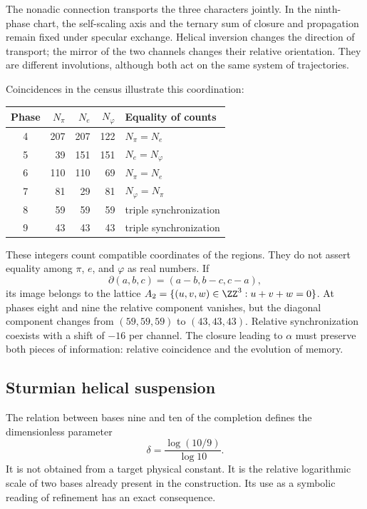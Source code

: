The nonadic connection transports the three characters jointly. In the ninth-phase chart, the self-scaling axis and the ternary sum of closure and propagation remain fixed under specular exchange. Helical inversion changes the direction of transport; the mirror of the two channels changes their relative orientation. They are different involutions, although both act on the same system of trajectories.

Coincidences in the census illustrate this coordination:
\begin{center}
\begin{tabular}{@{}c rrr l@{}}\toprule
Phase&\(N_\pi\)&\(N_e\)&\(N_\varphi\)&Equality of counts\\\midrule
4&207&207&122&\(N_\pi=N_e\)\\
5&39&151&151&\(N_e=N_\varphi\)\\
6&110&110&69&\(N_\pi=N_e\)\\
7&81&29&81&\(N_\varphi=N_\pi\)\\
8&59&59&59&triple synchronization\\
9&43&43&43&triple synchronization\\\bottomrule
\end{tabular}
\end{center}
These integers count compatible coordinates of the regions. They do not assert equality among \(\pi\), \(e\), and \(\varphi\) as real numbers. If
\[
 \partial(a,b,c)=(a-b,b-c,c-a),
\]
its image belongs to the lattice \(A_2=\{(u,v,w)\in\ZZ^3:u+v+w=0\}\). At phases eight and nine the relative component vanishes, but the diagonal component changes from \((59,59,59)\) to \((43,43,43)\). Relative synchronization coexists with a shift of \(-16\) per channel. The closure leading to \(\alpha\) must preserve both pieces of information: relative coincidence and the evolution of memory.

\subsection{Sturmian helical suspension}

The relation between bases nine and ten of the completion defines the dimensionless parameter
\begin{equation}
 \delta=\frac{\log(10/9)}{\log10}.
 \label{eq:delta-sturm}
\end{equation}
It is not obtained from a target physical constant. It is the relative logarithmic scale of two bases already present in the construction. Its use as a symbolic reading of refinement has an exact consequence.

